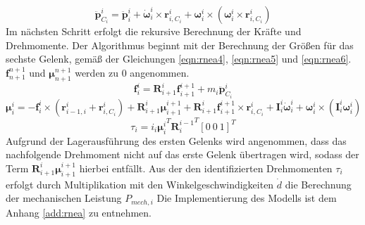%
\begin{equation}
	\label{eqn:rnea3}
	\ddot{\bm{p}}^i_{C_i} = \ddot{\bm{p}}^{i}_{i} + \dot{\bm{\omega}}^{i}_{i} \times \bm{r}^{i}_{i,C_i} + {\bm{\omega}}^{i}_{i} \times \left(  {\bm{\omega}}^{i}_{i} \times \bm{r}^{i}_{i,C_i} \right)
\end{equation}
%
Im nächsten Schritt erfolgt die rekursive Berechnung der Kräfte und Drehmomente. Der Algorithmus beginnt mit der Berechnung der Größen für das sechste Gelenk, gemäß der Gleichungen \ref{eqn:rnea4}, \ref{eqn:rnea5} und \ref{eqn:rnea6}. $\bm{f}^{n+1}_{n+1}$ und $\bm{\mu}^{n+1}_{n+1}$ werden zu 0 angenommen. 
%
\begin{equation}
	\label{eqn:rnea4}
	\bm{f}^{i}_{i} = \bm{R}^{i}_{i+1} \bm{f}^{i+1}_{i+1} + m_i\ddot{\bm{p}}^{i}_{C_i}
\end{equation}
%
\begin{equation}
	\label{eqn:rnea5}
	\bm{\mu}^{i}_{i} = -\bm{f}^{i}_{i} \times \left( \bm{r}^{i}_{i-1,i} + \bm{r}^{i}_{i,C_i} \right) + \bm{R}^{i}_{i+1} \bm{\mu}^{i+1}_{i+1} + \bm{R}^{i}_{i+1} \bm{f}^{i+1}_{i+1} \times \bm{r}^{i}_{i,C_i} + \bm{I}^{i}_{i} \dot{\bm{\omega}}^{i}_{i} + {\bm{\omega}}^{i}_{i} \times (\bm{I}^{i}_{i}{\bm{\omega}}^{i}_{i})
\end{equation}
\begin{equation}
	\label{eqn:rnea6}
	\tau_i = i_i{\bm{\mu}^{i}_{i}}^T {\bm{R}^{i-1}_{i}}^T [0~0~1]^T
\end{equation}
%
Aufgrund der Lagerausführung des ersten Gelenks wird angenommen, dass das nachfolgende Drehmoment nicht auf das erste Gelenk übertragen wird, sodass der Term $\bm{R}^{i}_{i+1} \bm{\mu}^{i+1}_{i+1}$ hierbei entfällt. Aus der den identifizierten Drehmomenten $\tau_i$ erfolgt durch Multiplikation mit den Winkelgeschwindigkeiten $\dot{{d}}$ die Berechnung der mechanischen Leistung $P_{mech,i}$ Die Implementierung des Modells ist dem Anhang \ref{add:rnea} zu entnehmen. \cite[S.~282~ff.]{Grimble.2009}
%
